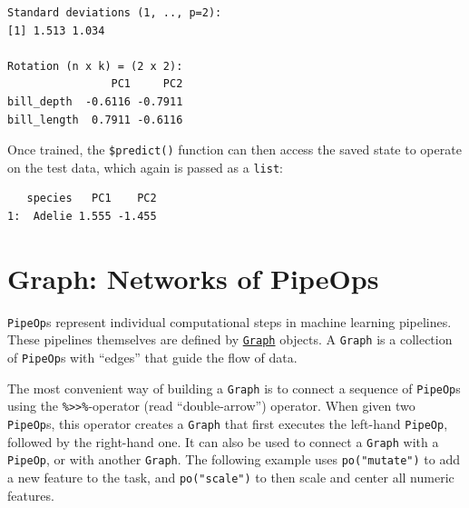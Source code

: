 \begin{Shaded}
\begin{Highlighting}[]
\SpecialCharTok{$}
\end{Highlighting}
\end{Shaded}

\begin{verbatim}
Standard deviations (1, .., p=2):
[1] 1.513 1.034

Rotation (n x k) = (2 x 2):
                PC1     PC2
bill_depth  -0.6116 -0.7911
bill_length  0.7911 -0.6116
\end{verbatim}

Once trained, the \texttt{\$predict()} function can then access the
saved state to operate on the test data, which again is passed as a
\texttt{list}:

\begin{Shaded}
\begin{Highlighting}[]
\OtherTok{=}\SpecialCharTok{$}\NormalTok{()}\SpecialCharTok{$}\NormalTok{(}\NormalTok{)}
\OtherTok{=} 
\OtherTok{=}\SpecialCharTok{$}
\NormalTok{poout[[}\NormalTok{]]}\SpecialCharTok{$}\NormalTok{()}
\end{Highlighting}
\end{Shaded}

\begin{verbatim}
   species   PC1    PC2
1:  Adelie 1.555 -1.455
\end{verbatim}

\hypertarget{sec-pipelines-graphs}{%
\section{Graph: Networks of PipeOps}\label{sec-pipelines-graphs}}

\texttt{PipeOp}s represent individual computational steps in machine
learning pipelines. These pipelines themselves are defined by
\href{https://mlr3pipelines.mlr-org.com/reference/Graph.html}{\texttt{Graph}}
objects. A \texttt{Graph} is a collection of \texttt{PipeOp}s with
``edges'' that guide the flow of data.

The most convenient way of building a \texttt{Graph} is to connect a
sequence of \texttt{PipeOp}s using the
\texttt{\%\textgreater{}\textgreater{}\%}-operator
{\marginnote{\begin{footnotesize}\texttt{\%\textgreater{}\textgreater{}\%}\end{footnotesize}}}
\index{\%>>\%} (read ``double-arrow'') operator. When given two
\texttt{PipeOp}s, this operator creates a \texttt{Graph} that first
executes the left-hand \texttt{PipeOp}, followed by the right-hand one.
It can also be used to connect a \texttt{Graph} with a \texttt{PipeOp},
or with another \texttt{Graph}. The following example uses
\texttt{po("mutate")} to add a new feature to the task, and
\texttt{po("scale")} to then scale and center all numeric
features.

